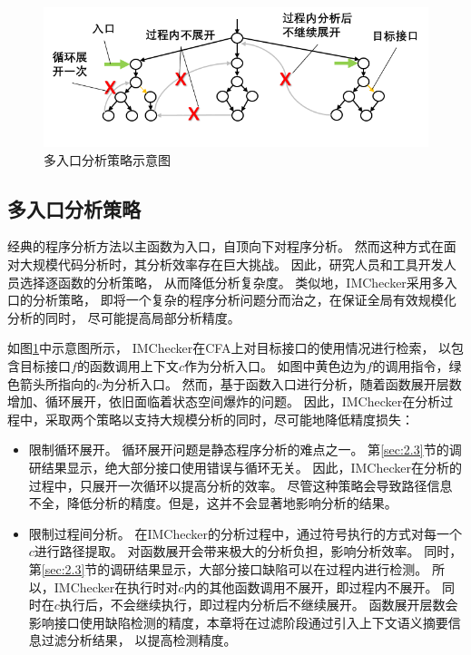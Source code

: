 \begin{figure}[b]
	\centering
	\includegraphics[width=0.9\linewidth]{figures/cp3-3-multi-entry.png}
	\caption{
		多入口分析策略示意图
	}
	\label{fig:3-3-multi-entry}
\end{figure}

\subsection{多入口分析策略}
经典的程序分析方法以主函数为入口，自顶向下对程序分析。
然而这种方式在面对大规模代码分析时，其分析效率存在巨大挑战。
因此，研究人员和工具开发人员选择逐函数的分析策略，
从而降低分析复杂度。
类似地，IMChecker采用多入口的分析策略，
即将一个复杂的程序分析问题分而治之，在保证全局有效规模化分析的同时，
尽可能提高局部分析精度。

如图\ref{fig:3-3-multi-entry}中示意图所示，
IMChecker在CFA上对目标接口的使用情况进行检索，
以包含目标接口$f$的函数调用上下文$c$作为分析入口。
如图中黄色边为$f$的调用指令，绿色箭头所指向的$c$为分析入口。
然而，基于函数入口进行分析，随着函数展开层数增加、循环展开，依旧面临着状态空间爆炸的问题。
因此，IMChecker在分析过程中，采取两个策略以支持大规模分析的同时，尽可能地降低精度损失：
\begin{itemize}
	\item 限制循环展开。
	循环展开问题是静态程序分析的难点之一。
	第\ref{sec:2.3}节的调研结果显示，绝大部分接口使用错误与循环无关。
	因此，IMChecker在分析的过程中，只展开一次循环以提高分析的效率。
	尽管这种策略会导致路径信息不全，降低分析的精度。但是，这并不会显著地影响分析的结果。
	\item 限制过程间分析。
	在IMChecker的分析过程中，通过符号执行的方式对每一个$c$进行路径提取。
	对函数展开会带来极大的分析负担，影响分析效率。
	同时，第\ref{sec:2.3}节的调研结果显示，大部分接口缺陷可以在过程内进行检测。
	所以，IMChecker在执行时对$c$内的其他函数调用不展开，即过程内不展开。
	同时在$c$执行后，不会继续执行，即过程内分析后不继续展开。
	函数展开层数会影响接口使用缺陷检测的精度，本章将在过滤阶段通过引入上下文语义摘要信息过滤分析结果，
	以提高检测精度。
\end{itemize}


